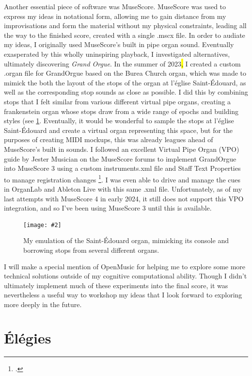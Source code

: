 \documentclass[12pt,twoside,maitrise]{dms_ks}
\newcommand{\customincludegraphics}[4][]{%
    \begin{figure}[H]
        \centering
        \texttt{[image: \#2]}
        \caption{#4}
	\label{#3} 
    \end{figure}
}
\theoremstyle{definition}
\begin{document}
{{Another essential piece of software was MuseScore. 
MuseScore was used to express my ideas in notational form, allowing me to gain distance from my improvisations and form the material without my physical constraints, leading all the way to the finished score, created with a single .mscx file. 
In order to audiate my ideas, I originally used MuseScore's built in pipe organ sound. 
Eventually exasperated by this wholly uninspiring playback, I investigated alternatives, ultimately discovering \textit{Grand Orgue}. 
In the summer of 2023\hl{,} I created a custom .organ file for GrandOrgue based on the Burea Church organ, which was made to mimick the both the layout of the stops of the organ at l'église Saint-Édouard, as well as the corresponding stop sounds as close as possible. 
I did this by combining stops that I felt similar from various different virtual pipe organs, creating a frankenstein organ whose stops draw from a wide range of epochs and building styles (see \cref{fig:grand_orgue}. 
Eventually, it would be wonderful to sample the stops at l'église Saint-Édouard and create a virtual organ representing this space, but for the purposes of creating MIDI mockups, this was already leagues ahead of MuseScore's built in sounds. 
I followed an excellent Virtual Pipe Organ (VPO) guide by Jester Musician on the MuseScore forums to implement GrandOrgue into MuseScore 3 using a custom instruments.xml file and Staff Text Properties to manage registration changes \footcite{musician_jester_how_2018}. 
I was even able to drive and manage the cues in OrganLab and Ableton Live with this same .xml file. 
Unfortunately, as of my last attempts with MuseScore 4 in early 2024, it still does not support this VPO integration, and so I've been using MuseScore 3 until this is available.

\customincludegraphics[scale=0.3]{grand_orgue.png}{fig:grand_orgue}{My emulation of the Saint-Édouard organ, mimicking its console and borrowing stops from several different organs.}

I will make a special mention of OpenMusic for helping me to explore some more technical solutions outside of my cognitive computational ability. 
Though I didn't ultimately implement much of these experiments into the final score, it was nevertheless a useful way to workshop my ideas that I look forward to exploring more deeply in the future.

\chapter{Élégies}

}}
\end{document}
